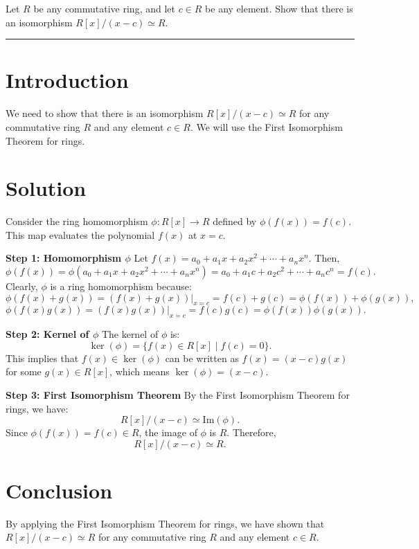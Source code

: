 \documentclass[12pt]{amsart}
\theoremstyle{definition}
\numberwithin{equation}{section}
\begin{document}
\newpage
\begin{exercise}{4} Let \(R\) be any commutative ring, and let \(c \in R\) be any element. Show that there is an isomorphism \(R[x]/(x-c) \simeq R\).

    \noindent\rule{\linewidth}{1pt}

    \section*{Introduction}
    We need to show that there is an isomorphism \(R[x]/(x-c) \simeq R\) for any commutative ring \(R\) and any element \(c \in R\). We will use the First Isomorphism Theorem for rings.

    \section*{Solution}
    Consider the ring homomorphism \(\phi: R[x] \to R\) defined by \(\phi(f(x)) = f(c)\). This map evaluates the polynomial \(f(x)\) at \(x = c\).

    \noindent \textbf{Step 1: Homomorphism \(\phi \)}
    Let \(f(x) = a_0 + a_1 x + a_2 x^2 + \cdots + a_n x^n\). Then,
    \[
    \phi(f(x)) = \phi(a_0 + a_1 x + a_2 x^2 + \cdots + a_n x^n) = a_0 + a_1 c + a_2 c^2 + \cdots + a_n c^n = f(c).
    \]
    Clearly, \(\phi \) is a ring homomorphism because:
    \[
    \phi(f(x) + g(x)) = (f(x) + g(x))|_{x=c} = f(c) + g(c) = \phi(f(x)) + \phi(g(x)),
    \]
    \[
    \phi(f(x)g(x)) = (f(x)g(x))|_{x=c} = f(c)g(c) = \phi(f(x))\phi(g(x)).
    \]

    \noindent \textbf{Step 2: Kernel of \(\phi \)}
    The kernel of \(\phi \) is:
    \[
    \ker(\phi) = \{ f(x) \in R[x] \mid f(c) = 0 \}.
    \]
    This implies that \(f(x) \in \ker(\phi)\) can be written as \(f(x) = (x - c)g(x)\) for some \(g(x) \in R[x]\), which means \(\ker(\phi) = (x - c)\).

    \noindent \textbf{Step 3: First Isomorphism Theorem}
    By the First Isomorphism Theorem for rings, we have:
    \[
    R[x]/(x - c) \simeq \text{Im}(\phi).
    \]
    Since \(\phi(f(x)) = f(c) \in R\), the image of \(\phi \) is \(R\). Therefore,
    \[
    R[x]/(x - c) \simeq R.
    \]

    \section*{Conclusion}
    By applying the First Isomorphism Theorem for rings, we have shown that \(R[x]/(x - c) \simeq R\) for any commutative ring \(R\) and any element \(c \in R\).

\end{exercise}
\end{document}

